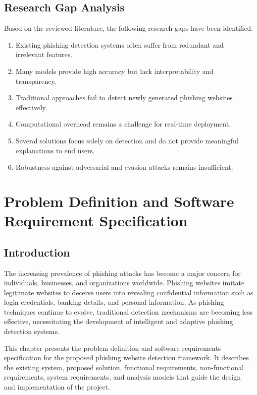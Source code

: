 \documentclass[12pt]{report}
\begin{document}
\section{Research Gap Analysis}

Based on the reviewed literature, the following research gaps have been identified:

\begin{enumerate}
    \item Existing phishing detection systems often suffer from redundant and irrelevant features.
    
    \item Many models provide high accuracy but lack interpretability and transparency.
    
    \item Traditional approaches fail to detect newly generated phishing websites effectively.
    
    \item Computational overhead remains a challenge for real-time deployment.
    
    \item Several solutions focus solely on detection and do not provide meaningful explanations to end users.
    
    \item Robustness against adversarial and evasion attacks remains insufficient.
\end{enumerate}

\chapter{Problem Definition and Software Requirement Specification}

\section{Introduction}

The increasing prevalence of phishing attacks has become a major concern for individuals, businesses, and organizations worldwide. Phishing websites imitate legitimate websites to deceive users into revealing confidential information such as login credentials, banking details, and personal information. As phishing techniques continue to evolve, traditional detection mechanisms are becoming less effective, necessitating the development of intelligent and adaptive phishing detection systems.

This chapter presents the problem definition and software requirements specification for the proposed phishing website detection framework. It describes the existing system, proposed solution, functional requirements, non-functional requirements, system requirements, and analysis models that guide the design and implementation of the project.
\end{document}
